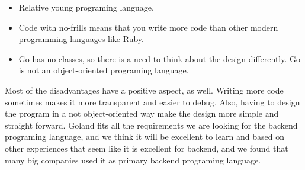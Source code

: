 \begin{itemize}
	\item Relative young programing language. 
	
	\item Code with no-frills means that you write more code than other modern programming languages like  Ruby.
	
	\item Go has no classes, so there is a  need to think about the design differently. Go is not an object-oriented programing language.
\end{itemize}


Most of the disadvantages have a positive aspect, as well. Writing more code sometimes makes it more transparent and easier to debug. Also, having to design the program in a not object-oriented way make the design more simple and straight forward.
Goland fits all the requirements we are looking for the backend programing language, and we think it will be excellent to learn and based on other experiences that seem like it is excellent for backend, and we found that many big companies used it as primary backend programing language.